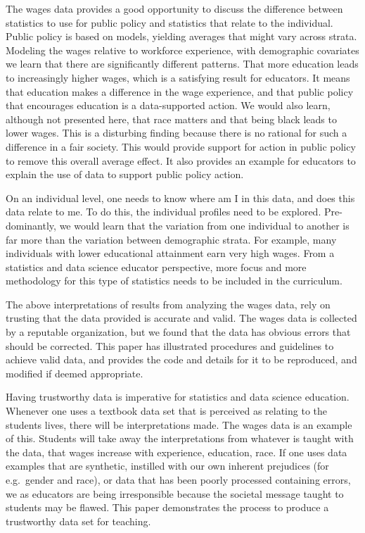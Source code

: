 \documentclass{article}
\begin{document}
The wages data provides a good opportunity to discuss the difference between statistics to use for public policy and statistics that relate to the individual. Public policy is based on models, yielding averages that might vary across strata. Modeling the wages relative to workforce experience, with demographic covariates we learn that there are significantly different patterns. That more education leads to increasingly higher wages, which is a satisfying result for educators. It means that education makes a difference in the wage experience, and that public policy that encourages education is a data-supported action. We would also learn, although not presented here, that race matters and that being black leads to lower wages. This is a disturbing finding because there is no rational for such a difference in a fair society. This would provide support for action in public policy to remove this overall average effect. It also provides an example for educators to explain the use of data to support public policy action.

On an individual level, one needs to know where am I in this data, and does this data relate to me. To do this, the individual profiles need to be explored. Pre-dominantly, we would learn that the variation from one individual to another is far more than the variation between demographic strata. For example, many individuals with lower educational attainment earn very high wages. From a statistics and data science educator perspective, more focus and more methodology for this type of statistics needs to be included in the curriculum.

The above interpretations of results from analyzing the wages data, rely on trusting that the data provided is accurate and valid. The wages data is collected by a reputable organization, but we found that the data has obvious errors that should be corrected. This paper has illustrated procedures and guidelines to achieve valid data, and provides the code and details for it to be reproduced, and modified if deemed appropriate.

Having trustworthy data is imperative for statistics and data science education. Whenever one uses a textbook data set that is perceived as relating to the students lives, there will be interpretations made. The wages data is an example of this. Students will take away the interpretations from whatever is taught with the data, that wages increase with experience, education, race. If one uses data examples that are synthetic, instilled with our own inherent prejudices (for e.g.~gender and race), or data that has been poorly processed containing errors, we as educators are being irresponsible because the societal message taught to students may be flawed. This paper demonstrates the process to produce a trustworthy data set for teaching.
\end{document}
